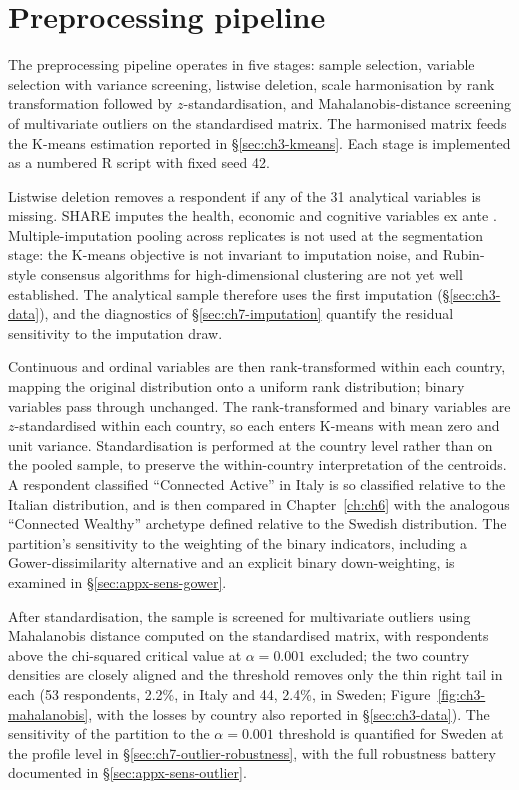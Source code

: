 \section{Preprocessing pipeline}
\label{sec:ch3-preprocessing}

The preprocessing pipeline operates in five stages: sample selection, variable selection with variance screening, listwise deletion, scale harmonisation by rank transformation followed by $z$-standardisation, and Mahalanobis-distance screening of multivariate outliers on the standardised matrix. The harmonised matrix feeds the K-means estimation reported in \S\ref{sec:ch3-kmeans}. Each stage is implemented as a numbered R script with fixed seed 42.

Listwise deletion removes a respondent if any of the 31 analytical variables is missing. SHARE imputes the health, economic and cognitive variables ex ante \citep{christelis2011}. Multiple-imputation pooling across replicates is not used at the segmentation stage: the K-means objective is not invariant to imputation noise, and Rubin-style consensus algorithms for high-dimensional clustering are not yet well established. The analytical sample therefore uses the first imputation (\S\ref{sec:ch3-data}), and the diagnostics of \S\ref{sec:ch7-imputation} quantify the residual sensitivity to the imputation draw.

Continuous and ordinal variables are then rank-transformed within each country, mapping the original distribution onto a uniform rank distribution; binary variables pass through unchanged. The rank-transformed and binary variables are $z$-standardised within each country, so each enters K-means with mean zero and unit variance. Standardisation is performed at the country level rather than on the pooled sample, to preserve the within-country interpretation of the centroids. A respondent classified ``Connected Active'' in Italy is so classified relative to the Italian distribution, and is then compared in Chapter~\ref{ch:ch6} with the analogous ``Connected Wealthy'' archetype defined relative to the Swedish distribution. The partition's sensitivity to the weighting of the binary indicators, including a Gower-dissimilarity alternative and an explicit binary down-weighting, is examined in \S\ref{sec:appx-sens-gower}.

After standardisation, the sample is screened for multivariate outliers using Mahalanobis distance computed on the standardised matrix, with respondents above the chi-squared critical value at $\alpha = 0.001$ excluded; the two country densities are closely aligned and the threshold removes only the thin right tail in each (53 respondents, 2.2\%, in Italy and 44, 2.4\%, in Sweden; Figure~\ref{fig:ch3-mahalanobis}, with the losses by country also reported in \S\ref{sec:ch3-data}). The sensitivity of the partition to the $\alpha = 0.001$ threshold is quantified for Sweden at the profile level in \S\ref{sec:ch7-outlier-robustness}, with the full robustness battery documented in \S\ref{sec:appx-sens-outlier}.

